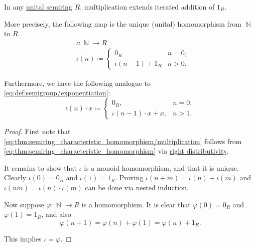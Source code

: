 \begin{proposition}\label{thm:semiring_characteristic_homomorphism}
  In any \hyperref[def:semiring]{unital semiring} \( R \), multiplication extends iterated addition of \( 1_R \).

  More precisely, the following map is the unique (unital) homomorphism from \( \BbbN \) to \( R \).
  \begin{equation}\label{eq:thm:semiring_characteristic_homomorphism}
    \begin{aligned}
      &\iota: \BbbN \to R \\
      &\iota(n) \coloneqq \begin{cases}
        0_R                &n = 0, \\
        \iota(n - 1) + 1_R &n > 0.
      \end{cases}
    \end{aligned}
  \end{equation}

  Furthermore, we have the following analogue to \eqref{eq:def:semigroup/exponentiation}:
  \begin{equation}\label{eq:thm:semiring_characteristic_homomorphism/multiplication}
    \iota(n) \cdot x \coloneqq \begin{cases}
      0_R,                      &n = 0, \\
      \iota(n - 1) \cdot x + x, &n > 1.
    \end{cases}
  \end{equation}
\end{proposition}
\begin{proof}
  First note that \eqref{eq:thm:semiring_characteristic_homomorphism/multiplication} follows from \eqref{eq:thm:semiring_characteristic_homomorphism} via \hyperref[eq:def:semiring/theory/axioms/distributivity/right]{right distributivity}.

  It remains to show that \( \iota \) is a monoid homomorphism, and that it is unique. Clearly \( \iota(0) = 0_R \) and \( \iota(1) = 1_R \). Proving \( \iota(n + m) = \iota(n) + \iota(m) \) and \( \iota(nm) = \iota(n) \cdot \iota(m) \) can be done via nested induction.

  Now suppose \( \varphi: \BbbN \to R \) is a homomorphism. It is clear that \( \varphi(0) = 0_R \) and \( \varphi(1) = 1_R \), and also
  \begin{equation*}
    \varphi(n + 1) = \varphi(n) + \varphi(1) = \varphi(n) + 1_R.
  \end{equation*}

  This implies \( \iota = \varphi \).
\end{proof}

